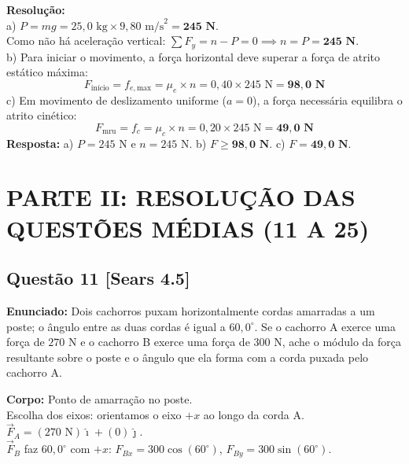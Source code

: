 \documentclass[11pt,a4paper]{article}
\begin{document}
\noindent
\textbf{Resolução:}\\
a) $P = mg = 25,0\text{ kg} \times 9,80\text{ m/s}^2 = \mathbf{245\text{ N}}$.\\
Como não há aceleração vertical: $\sum F_y = n - P = 0 \implies n = P = \mathbf{245\text{ N}}$.\\
b) Para iniciar o movimento, a força horizontal deve superar a força de atrito estático máxima:
\[ F_{\text{início}} = f_{e,\text{max}} = \mu_e \times n = 0,40 \times 245\text{ N} = \mathbf{98,0\text{ N}} \]
c) Em movimento de deslizamento uniforme ($a = 0$), a força necessária equilibra o atrito cinético:
\[ F_{\text{mru}} = f_c = \mu_c \times n = 0,20 \times 245\text{ N} = \mathbf{49,0\text{ N}} \]
\textbf{Resposta:} a) $P = 245\text{ N}$ e $n = 245\text{ N}$. b) $F \ge \mathbf{98,0\text{ N}}$. c) $F = \mathbf{49,0\text{ N}}$.

\newpage
\section*{PARTE II: RESOLUÇÃO DAS QUESTÕES MÉDIAS (11 A 25)}

\subsection*{Questão 11 [Sears 4.5]}
\textbf{Enunciado:} Dois cachorros puxam horizontalmente cordas amarradas a um poste; o ângulo entre as duas cordas é igual a $60,0^\circ$. Se o cachorro A exerce uma força de $270\text{ N}$ e o cachorro B exerce uma força de $300\text{ N}$, ache o módulo da força resultante sobre o poste e o ângulo que ela forma com a corda puxada pelo cachorro A.

\begin{dclbox}
\textbf{Corpo:} Ponto de amarração no poste.\\
Escolha dos eixos: orientamos o eixo $+x$ ao longo da corda A.\\
$\vec{F}_A = (270\text{ N})\hat{\imath} + (0)\hat{\jmath}$.\\
$\vec{F}_B$ faz $60,0^\circ$ com $+x$: $F_{Bx} = 300\cos(60^\circ)$, $F_{By} = 300\sin(60^\circ)$.
\end{dclbox}
\end{document}
